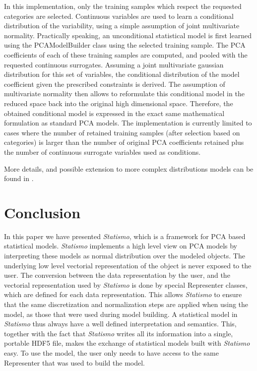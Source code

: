 \documentclass{InsightArticle}
\newcommand{\Statismo}{\emph{Statismo}\xspace}
\begin{document}
In this implementation, only the training samples which respect the
requested categories are selected.  Continuous variables are used to
learn a conditional distribution of the variability, using a simple
assumption of joint multivariate normality. Practically speaking, an
unconditional statistical model is first learned using the
PCAModelBuilder class using the selected training sample. The PCA
coefficients of each of these training samples are computed, and
pooled with the requested continuous surrogates. Assuming a joint
multivariate gaussian distribution for this set of variables, the
conditional distribution of the model coefficient given the prescribed
constraints is derived. The assumption of multivariate normality then
allows to reformulate this conditional model in the reduced space back
into the original high dimensional space. Therefore, the obtained
conditional model is expressed in the exact same mathematical
formulation as standard PCA models.  The implementation is currently
limited to cases where the number of retained training samples (after
selection based on categories) is larger than the number of original
PCA coefficients retained plus the number of continuous surrogate
variables used as conditions.

More details, and possible extension to more complex distributions
models can be found in \cite{xxx}.

\section{Conclusion}
In this paper we have presented \Statismo, which is a framework for
PCA based statistical models.  \Statismo implements a high level view
on PCA models by interpreting these models as normal distribution over
the modeled objects. The underlying low level vectorial representation
of the object is never exposed to the user.  The conversion between
the data representation by the user, and the vectorial representation
used by \Statismo is done by special Representer classes, which are
defined for each data representation. This allows \Statismo to ensure
that the same discretization and normalization steps are applied when
using the model, as those that were used during model building.  A
statistical model in \Statismo thus always have a well defined
interpretation and semantics.  This, together with the fact that
\Statismo writes all its information into a single, portable HDF5
file, makes the exchange of statistical models built with \Statismo
easy. To use the model, the user only needs to have access to the same Representer that was used to build the model. 
\end{document}
